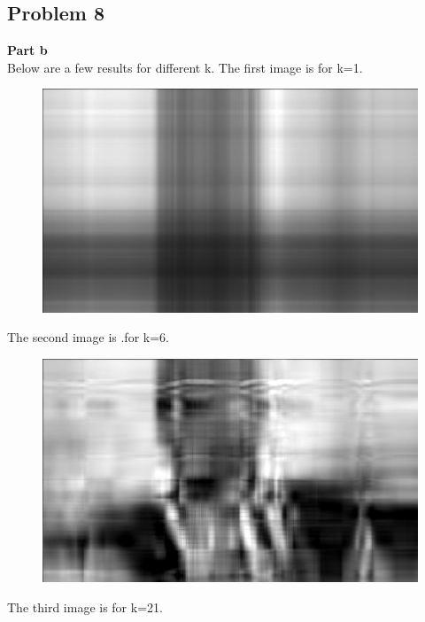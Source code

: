 \documentclass[a4paper]{article}
\begin{document}
\begin{Large}
	\subsection*{Problem 8}
	\textbf{Part b}\\
	Below are a few results for different k. The first image is for k=1.
	\begin{figure}[!h]
		\begin{center}
			\includegraphics[scale=.45]{ReconstructedHajik=1}
		\end{center}
	\end{figure}
The second image is .for k=6.
	\begin{figure}[!h]
	\begin{center}
		\includegraphics[scale=.45]{ReconstructedHajik=6}
	\end{center}
\end{figure}
The third image is for k=21.
	\begin{figure}[!h]
	\begin{center}

\end{center}
\end{figure}
\end{Large}
\end{document}
